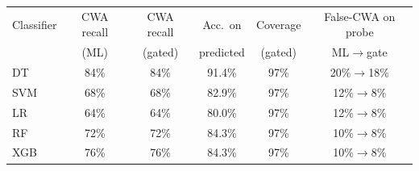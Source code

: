 \begin{tabular}{lccccc}
\toprule
Classifier & CWA recall & CWA recall & Acc.\ on & Coverage & False-CWA on probe \\
 & (ML) & (gated) & predicted & (gated) & ML$\to$gate \\
\midrule
DT & 84\% & 84\% & 91.4\% & 97\% & 20\%$\to$18\% \\
SVM & 68\% & 68\% & 82.9\% & 97\% & 12\%$\to$8\% \\
LR & 64\% & 64\% & 80.0\% & 97\% & 12\%$\to$8\% \\
RF & 72\% & 72\% & 84.3\% & 97\% & 10\%$\to$8\% \\
XGB & 76\% & 76\% & 84.3\% & 97\% & 10\%$\to$8\% \\
\bottomrule
\end{tabular}
